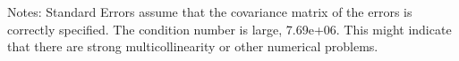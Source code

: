 Notes: \newline
 [1] Standard Errors assume that the covariance matrix of the errors is correctly specified. \newline
 [2] The condition number is large, 7.69e+06. This might indicate that there are \newline
 strong multicollinearity or other numerical problems.
